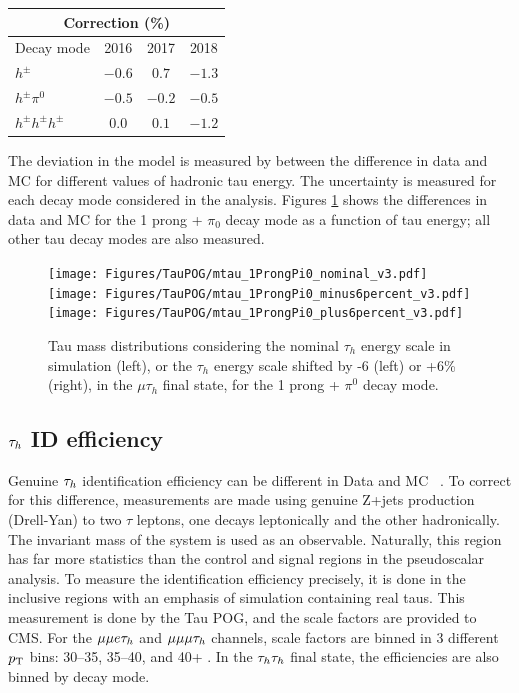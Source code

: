 \begin{table}[h]
  \begin{center}
    \label{tab:TES}
    \begin{tabular} { l | c  c  c }
      \hline \multicolumn{4}{c}{Correction (\%)} \\
      \hline Decay mode & 2016 & 2017 & 2018 \\ \hline
      $h^{\pm}$ & $-0.6$ & $0.7$ & $-1.3$  \\ 
      $h^{\pm}\pi^{0}$ & $-0.5$ & $-0.2$ & $-0.5$  \\ 
      $h^{\pm}h^{\pm}h^{\pm}$ & $0.0$ & $0.1$ & $-1.2$ \\ 
    \end{tabular}
  \end{center}
\end{table}

The deviation in the model is measured by between the difference in data and MC for different values of hadronic tau energy. The uncertainty is measured for each decay mode considered in the analysis. Figures \ref{fig:taues} shows the differences in data and MC for the 1 prong + $\pi_0$ decay mode as a function of tau energy; all other tau decay modes are also measured. 

\begin{figure}[h!]
    \begin{center}
        \texttt{[image: Figures/TauPOG/mtau\_1ProngPi0\_nominal\_v3.pdf]}
        \texttt{[image: Figures/TauPOG/mtau\_1ProngPi0\_minus6percent\_v3.pdf]}
        \texttt{[image: Figures/TauPOG/mtau\_1ProngPi0\_plus6percent\_v3.pdf]}
    \end{center}
    \caption{Tau mass distributions considering the nominal $\tau_h$ energy scale in simulation (left), or the $\tau_h$ energy scale shifted by -6 (left) or +6\% (right), in the $\mu\tau_h$ final state, for the 1 prong + $\pi^0$ decay mode.}
    \label{fig:taues}
\end{figure}

\subsection{$\tau_h$ ID efficiency}

Genuine $\tau_h$ identification efficiency can be different in Data and MC ~\cite{TAUIDTwiki}. To correct for this difference, measurements are 
made using genuine Z+jets production (Drell-Yan) to two $\tau$ leptons, one decays leptonically and the other hadronically. The invariant mass of the system is used as an observable. Naturally, this region has far more statistics than the control and signal regions in the pseudoscalar analysis. To measure the identification efficiency precisely, it is done in the inclusive regions with an emphasis of simulation containing real taus. This measurement is done by the Tau POG, and the scale factors are provided to CMS. 
For the $\mu\mu e \tau_h$ and $\mu\mu\mu\tau_h$ channels, scale factors are binned in 3 different $p_{\mathrm{T}}$ bins: 30--35, 35--40, and 40+ \GeV. In the $\tau_h\tau_h$ final state, the efficiencies are also binned by decay mode. 


